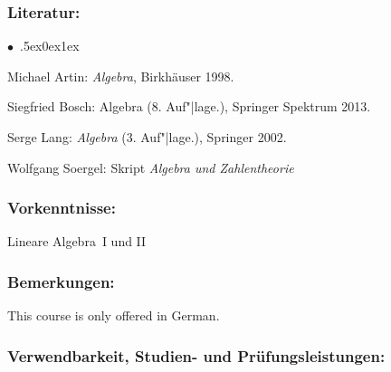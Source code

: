 \documentclass[a4paper,10pt]{article}
\renewenvironment{itemize}{\begin{list}{$\bullet$\ }{\itemsep.5ex\setlength{\topsep}{0.5\itemsep}\parsep0ex\labelsep1ex\settowidth{\labelwidth}{$\bullet$\ }\setlength{\leftmargin}{\labelwidth}\addtolength{\leftmargin}{3ex}\addtolength{\leftmargin}{\labelsep}}}{\end{list}}
\begin{document}
\subsubsection*{\large
    Literatur:
}
\begin{itemize}
\item Michael Artin: \emph{Algebra}, Birkhäuser 1998.
\item Siegfried Bosch: Algebra (8. Auf"|lage.), Springer Spektrum 2013.
\item Serge Lang: \emph{Algebra} (3. Auf"|lage.), Springer 2002.
\item Wolfgang Soergel: Skript \emph{Algebra und Zahlentheorie}
\end{itemize}
\subsubsection*{\large
    Vorkenntnisse:
}
Lineare Algebra~I und II
\subsubsection*{\large
    Bemerkungen:
}
This course is only offered in German.
\cleardoublepage
\subsubsection*{\large
    Verwendbarkeit, Studien- und Prüfungsleistungen:
}
\end{document}
